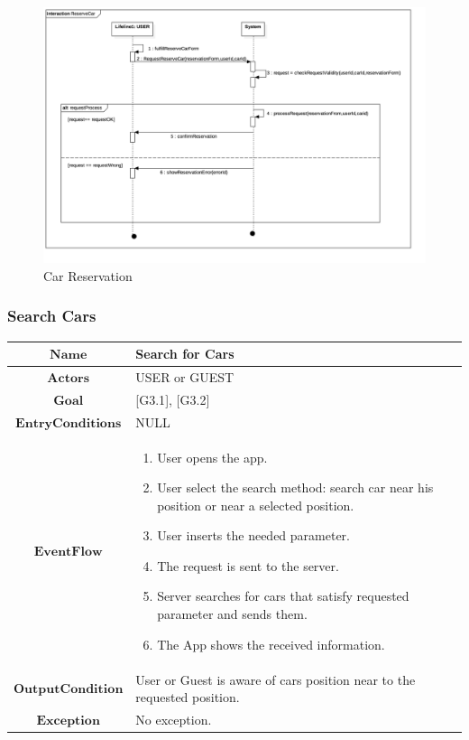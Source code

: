 \begin{center}
\begin{figure}[H]
\includegraphics[scale=0.2]{UML/png/Collaboration2__Interaction1__ReserveCar_6}

\caption{Car Reservation}

\end{figure}
\par\end{center}

\subsubsection{Search Cars}

\begin{tabular}{|c|>{\raggedright}p{10cm}|}
\hline 
$\boldsymbol{\mathbf{Name}}$ & Search for Cars\tabularnewline
\hline 
$\mathbf{Actors}$ & USER or GUEST\tabularnewline
\hline 
$\mathbf{Goal}$ & {[}G3.1{]}, {[}G3.2{]} \tabularnewline
\hline 
$\mathbf{EntryConditions}$ & NULL\tabularnewline
\hline 
$\mathbf{EventFlow}$ & \begin{enumerate}
\item User opens the app.
\item User select the search method: search car near his position or near
a selected position.
\item User inserts the needed parameter.
\item The request is sent to the server.
\item Server searches for cars that satisfy requested parameter and sends
them.
\item The App shows the received information.
\end{enumerate}
\tabularnewline
\hline 
$\mathbf{OutputCondition}$ & User or Guest is aware of cars position near to the requested position. \tabularnewline
\hline 
$\mathbf{Exception}$ & No exception.\tabularnewline
\hline 
\end{tabular}\\
\\

